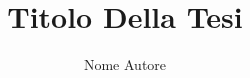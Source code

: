 \documentclass[12pt,a4paper,openany,oneside]{book}
\begin{document}


\title{Titolo Della Tesi}
\author{Nome Autore}



\tableofcontents



\newpage
{}

\end{document}
